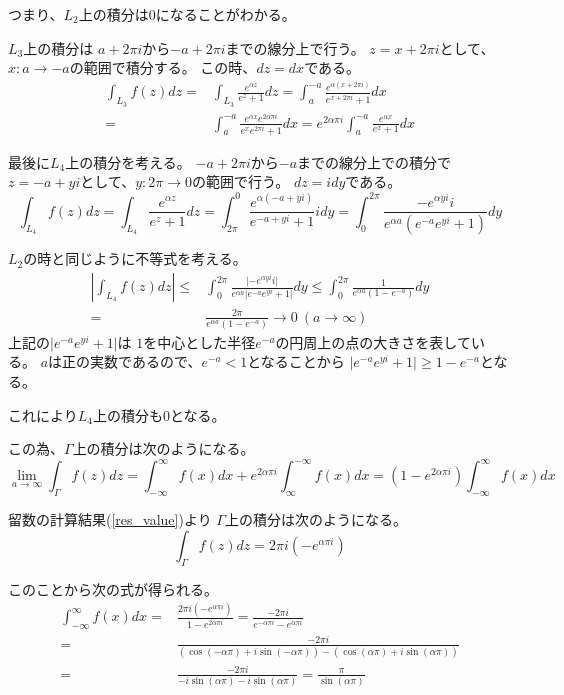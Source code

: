 \documentclass[12pt,b5paper]{ltjsarticle}
\begin{document}
つまり、$L_2$上の積分は0になることがわかる。


$L_3$上の積分は
$a+2\pi i$から$-a+2\pi i$までの線分上で行う。
$z=x+2\pi i$として、$x:a\to -a$の範囲で積分する。
この時、$dz=dx$である。
\begin{align}
 \int_{L_3} f(z) dz
  =& \int_{L_3} \frac{e^{\alpha z}}{e^{z}+1} dz
  = \int_{a}^{-a}
  \frac{e^{\alpha (x+2\pi i)}}{e^{x+2\pi i}+1}
  dx\\
  =& \int_{a}^{-a}
  \frac{ e^{\alpha x} e^{2 \alpha \pi i} }{ e^{x} e^{2\pi i} +1}
  dx
  = e^{2 \alpha \pi i}
 \int_{a}^{-a} \frac{ e^{\alpha x}}{ e^{x} +1} dx
\end{align}


最後に$L_4$上の積分を考える。
$-a+2\pi i$から$-a$までの線分上での積分で
$z=-a+yi$として、$y:2\pi\to 0$の範囲で行う。
$dz=idy$である。
\begin{equation}
 \int_{L_4} f(z) dz
  = \int_{L_4} \frac{e^{\alpha z}}{e^{z}+1} dz
  = \int_{2\pi}^{0}
  \frac{e^{\alpha (-a+yi)}}{e^{-a+yi}+1}
  i dy
  = \int_{0}^{2\pi}
  \frac{ - e^{\alpha yi} i}{ e^{\alpha a} (e^{-a}e^{yi} + 1) }
  dy
\end{equation}

$L_2$の時と同じように不等式を考える。
\begin{align}
 \left\lvert \int_{L_4} f(z) dz \right\rvert
 \leq &
 \int_{0}^{2\pi}
  \frac{ \lvert - e^{\alpha yi} i \rvert }{ e^{\alpha a} \lvert e^{-a}e^{yi} + 1 \rvert }
  dy
 \leq \int_{0}^{2\pi} \frac{ 1 }{ e^{\alpha a} (1- e^{-a}) } dy\\
 =&  \frac{ 2\pi }{ e^{\alpha a} (1- e^{-a}) }
 \to 0 \ (a\to\infty)
\end{align}
上記の$\lvert e^{-a}e^{yi} + 1 \rvert$は
$1$を中心とした半径$e^{-a}$の円周上の点の大きさを表している。
$a$は正の実数であるので、$e^{-a}<1$となることから
$\lvert e^{-a}e^{yi} + 1 \rvert \geq 1-e^{-a}$となる。

これにより$L_4$上の積分も0となる。

この為、$\Gamma$上の積分は次のようになる。
\begin{equation}
 \lim_{a\to\infty} \int_{\Gamma} f(z) dz
  = \int_{-\infty}^{\infty} f(x) dx
  + e^{2 \alpha \pi i}
 \int_{\infty}^{-\infty}
 f(x) dx
 = (1-e^{2 \alpha \pi i})\int_{-\infty}^{\infty} f(x) dx
\end{equation}

留数の計算結果(\ref{res_value})より
$\Gamma$上の積分は次のようになる。
\begin{equation}
 \int_{\Gamma} f(z) dz
  =
 2\pi i ( -e^{\alpha \pi i} )
\end{equation}

このことから次の式が得られる。
\begin{align}
 \int_{-\infty}^{\infty} f(x) dx
  =&
  \frac{ 2\pi i ( -e^{\alpha \pi i} ) }{ 1-e^{2 \alpha \pi i} }
  = \frac{ -2\pi i }{ e^{-\alpha \pi i}-e^{ \alpha \pi i} }\\
  =& \frac{ -2\pi i }{ (\cos{(-\alpha \pi)}+i\sin{(-\alpha \pi)})-(\cos{(\alpha \pi)}+i\sin{(\alpha \pi)}) }\\
 =& \frac{ -2\pi i }{ -i\sin{(\alpha \pi)}-i\sin{(\alpha \pi)} }
  = \frac{\pi}{\sin{(\alpha \pi)}}
\end{align}


\hrulefill
\end{document}
